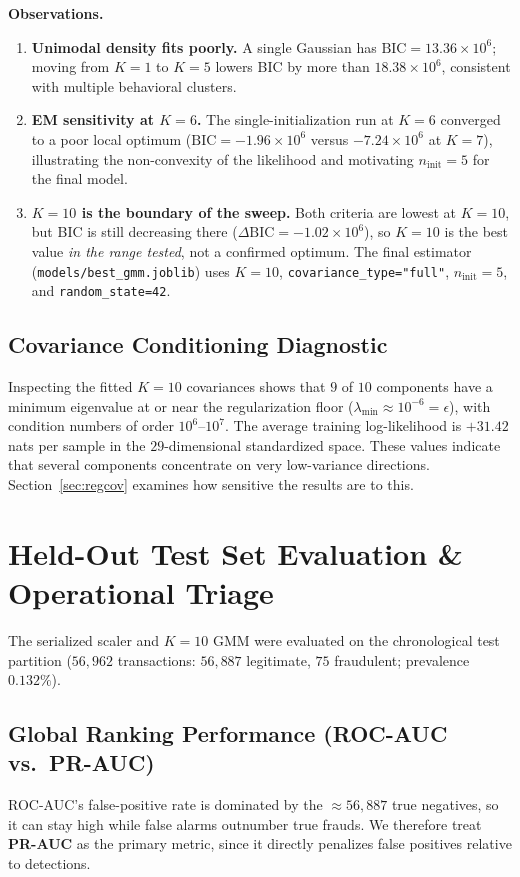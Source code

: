 \documentclass[11pt, a4paper]{article}
\begin{document}
\textbf{Observations.}
\begin{enumerate}
    \item \textbf{Unimodal density fits poorly.} A single Gaussian has $\text{BIC} = 13.36\times10^{6}$; moving from $K=1$ to $K=5$ lowers BIC by more than $18.38\times10^{6}$, consistent with multiple behavioral clusters.
    \item \textbf{EM sensitivity at $K=6$.} The single-initialization run at $K=6$ converged to a poor local optimum ($\text{BIC} = -1.96\times10^{6}$ versus $-7.24\times10^{6}$ at $K=7$), illustrating the non-convexity of the likelihood and motivating $n_{\text{init}} = 5$ for the final model.
    \item \textbf{$K=10$ is the boundary of the sweep.} Both criteria are lowest at $K=10$, but BIC is still decreasing there ($\Delta\text{BIC} = -1.02\times10^{6}$), so $K=10$ is the best value \emph{in the range tested}, not a confirmed optimum. The final estimator (\texttt{models/best\_gmm.joblib}) uses $K=10$, \texttt{covariance\_type="full"}, $n_{\text{init}}=5$, and \texttt{random\_state=42}.
\end{enumerate}

\subsection{Covariance Conditioning Diagnostic}
Inspecting the fitted $K=10$ covariances shows that $9$ of $10$ components have a minimum eigenvalue at or near the regularization floor ($\lambda_{\min} \approx 10^{-6} = \epsilon$), with condition numbers of order $10^{6}$--$10^{7}$. The average training log-likelihood is $+31.42$ nats per sample in the $29$-dimensional standardized space. These values indicate that several components concentrate on very low-variance directions. Section~\ref{sec:regcov} examines how sensitive the results are to this.

\section{Held-Out Test Set Evaluation \& Operational Triage}

The serialized scaler and $K=10$ GMM were evaluated on the chronological test partition ($56{,}962$ transactions: $56{,}887$ legitimate, $75$ fraudulent; prevalence $0.132\%$).

\subsection{Global Ranking Performance (ROC-AUC vs.\ PR-AUC)}
ROC-AUC's false-positive rate is dominated by the $\approx 56{,}887$ true negatives, so it can stay high while false alarms outnumber true frauds. We therefore treat \textbf{PR-AUC} as the primary metric, since it directly penalizes false positives relative to detections.
\end{document}
